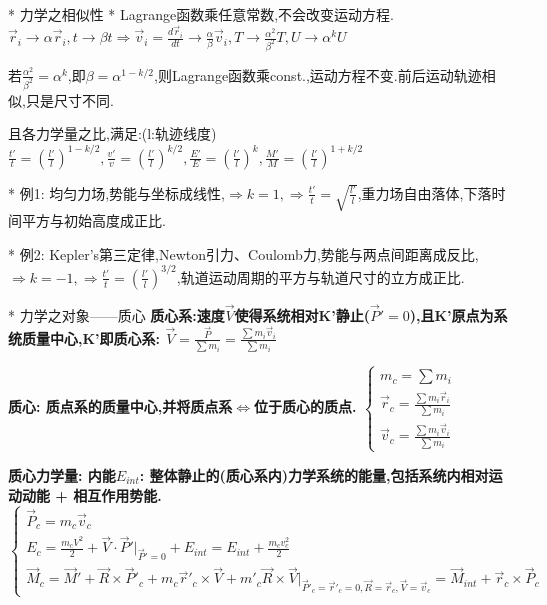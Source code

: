 * 力学之相似性
    * Lagrange函数乘任意常数,不会改变运动方程.
        $\vec r_i \to \alpha \vec r_i, t \to \beta t 
        \Rightarrow \vec v_i = \frac{d\vec r_i}{dt} \to \frac{\alpha}{\beta}\vec v_i,T \to \frac{\alpha^2}{\beta^2}T,U \to  \alpha^k U$
    
    若$\frac{\alpha^2}{\beta^2} = \alpha ^ k $,即$\beta = \alpha^{1-k/2}$,则Lagrange函数乘const.,运动方程不变.前后运动轨迹相似,只是尺寸不同.
    
    且各力学量之比,满足:\quad(l:轨迹线度)
        $\frac{t'}{t} = (\frac{l'}{l})^{1-k/2},\frac{v'}{v} = (\frac{l'}{l})^{k/2},\frac{E'}{E} = (\frac{l'}{l})^k,\frac{M'}{M} = (\frac{l'}{l})^{1+k/2}$
        
    * 例1: 均匀力场,势能与坐标成线性,$\Rightarrow k=1,\Rightarrow \frac{t'}{t} = \sqrt{\frac{l'}{l}}$,重力场自由落体,下落时间平方与初始高度成正比.
    
    * 例2: Kepler's第三定律,Newton引力、Coulomb力,势能与两点间距离成反比,$\Rightarrow k=-1,\Rightarrow \frac{t'}{t} = (\frac{l'}{l})^{3/2}$,轨道运动周期的平方与轨道尺寸的立方成正比.


    * 力学之对象——质心
        \bf{质心系}:\exists 速度$\vec V$使得系统相对K'静止($\vec P' = 0$),且K'原点为系统质量中心,K'即质心系:
            $\vec V = \frac{\vec P}{\sum m_i} = \frac{\sum m_i \vec v_i}{\sum m_i}$
            
        \bf{质心}: 质点系的质量中心,并将质点系$\Leftrightarrow$位于质心的质点.
            $
                \left\{ \begin{array}{ll}
                m_c = \sum m_i\\
                \vec r_c = \frac{\sum m_i \vec r_i}{\sum m_i}\\
                \vec v_c = \frac{\sum m_i \vec v_i}{\sum m_i}
                \end{array} \right.
            $
            
        \bf{质心力学量}:
            内能$E_{int}$: 整体静止的(质心系内)力学系统的能量,包括系统内相对运动动能 + 相互作用势能.\\
            $
                \left\{ \begin{array}{ll}
                \vec P_c = m_c \vec v_c\\
                E_c = \frac{m_c V^2}{2} + \vec V \cdot \vec P' |_{\vec P'=0} + E_{int} = E_{int} + \frac{m_c v_c^2}{2}\\
                \vec M_c = \vec M' + \vec R \times \vec P'_c + m_c \vec r'_c \times \vec V + m'_c \vec R \times \vec V|_{\vec P'_c =\vec r'_c = 0, \vec R =\vec r_c, \vec V =\vec v_c} = \vec M_{int} + \vec r_c \times \vec P_c 
                \end{array} \right.
            $
            

